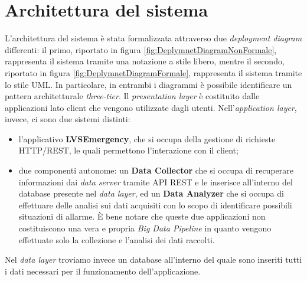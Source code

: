 \clearpage
\section{Architettura del sistema}
L'architettura del sistema è stata formalizzata attraverso due \textit{deployment diagram} differenti: il primo, riportato in figura \ref{fig:DeplymnetDiagramNonFormale}, rappresenta il sistema tramite una notazione a stile libero, mentre il secondo, riportato in figura \ref{fig:DeplymnetDiagramFormale}, rappresenta il sistema tramite lo stile UML. In particolare, in entrambi i diagrammi è possibile identificare un pattern architetturale \textit{three-tier}. 
Il \textit{presentation layer} è costituito dalle applicazioni lato client che vengono utilizzate dagli utenti. Nell'\textit{application layer}, invece, ci sono due sistemi distinti:

\begin{itemize}
	\item l'applicativo \textbf{LVSEmergency}, che si occupa della gestione di richieste HTTP/REST, le quali permettono l'interazione con il client;
	\item due componenti autonome: un \textbf{Data Collector} che si occupa di recuperare informazioni dai \textit{data server} tramite API REST e le inserisce all'interno del database presente nel \textit{data layer}, ed un \textbf{Data Analyzer} che si occupa di effettuare delle analisi sui dati acquisiti con lo scopo di identificare possibili situazioni di allarme. È bene notare che queste due applicazioni non costituiscono una vera e propria \textit{Big Data Pipeline} in quanto vengono effettuate solo la collezione e l'analisi dei dati raccolti. 
\end{itemize}

Nel \textit{data layer} troviamo invece un database all'interno del quale sono inseriti tutti i dati necessari per il funzionamento dell'applicazione.

